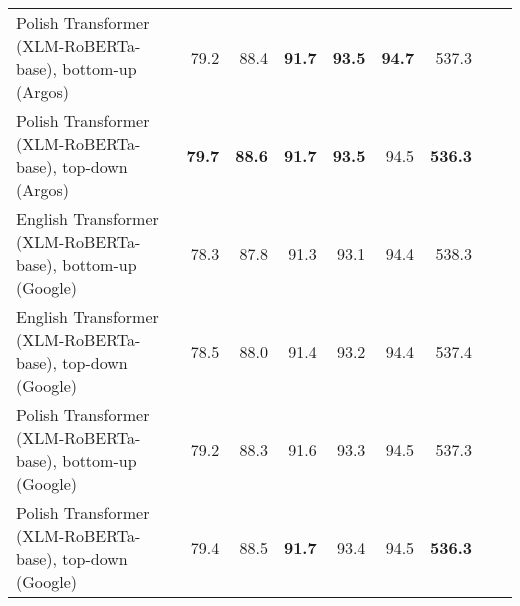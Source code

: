 \begin{table}[ht!]
{\begin{tabular}{lrrrrrrrr}
  Polish Transformer (XLM-RoBERTa-base), bottom-up (Argos) & 79.2 & 88.4 & \textbf{91.7} & \textbf{93.5} & \textbf{94.7} & 537.3 \\ 
  Polish Transformer (XLM-RoBERTa-base), top-down (Argos) & \textbf{79.7} & \textbf{88.6} & \textbf{91.7} & \textbf{93.5} & 94.5 & \textbf{536.3} \\ 
  English Transformer (XLM-RoBERTa-base), bottom-up (Google) & 78.3 & 87.8 & 91.3 & 93.1 & 94.4 & 538.3 \\ 
  English Transformer (XLM-RoBERTa-base), top-down (Google) & 78.5 & 88.0 & 91.4 & 93.2 & 94.4 & 537.4 \\ 
  Polish Transformer (XLM-RoBERTa-base), bottom-up (Google) & 79.2 & 88.3 & 91.6 & 93.3 & 94.5 & 537.3 \\ 
  Polish Transformer (XLM-RoBERTa-base), top-down (Google) & 79.4 & 88.5 & \textbf{91.7} & 93.4 & 94.5 & \textbf{536.3} \\ 
   \hline
\end{tabular}
}
\end{table}




